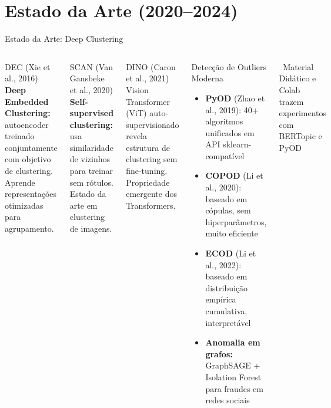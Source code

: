 \documentclass[aspectratio=169]{beamer}
\begin{document}
\section{Estado da Arte (2020--2024)}

\begin{frame}[shrink=5]{Estado da Arte: Deep Clustering}
    \begin{columns}
        \begin{block}{DEC (Xie et al., 2016)}
            \footnotesize
            \textbf{Deep Embedded Clustering:} autoencoder treinado conjuntamente com objetivo de clustering. Aprende representações otimizadas para agrupamento.
        \end{block}
        \begin{block}{SCAN (Van Gansbeke et al., 2020)}
            \footnotesize
            \textbf{Self-supervised clustering:} usa similaridade de vizinhos para treinar sem rótulos. Estado da arte em clustering de imagens.
        \end{block}
        \begin{block}{DINO (Caron et al., 2021)}
            \footnotesize
            Vision Transformer (ViT) auto-supervisionado revela estrutura de clustering sem fine-tuning. Propriedade emergente dos Transformers.
        \end{block}
        \begin{block}{Detecção de Outliers Moderna}
            \begin{itemize}\footnotesize
                \item \textbf{PyOD} (Zhao et al., 2019): 40+ algoritmos unificados em API sklearn-compatível
                \item \textbf{COPOD} (Li et al., 2020): baseado em cópulas, sem hiperparâmetros, muito eficiente
                \item \textbf{ECOD} (Li et al., 2022): baseado em distribuição empírica cumulativa, interpretável
                \item \textbf{Anomalia em grafos:} GraphSAGE + Isolation Forest para fraudes em redes sociais
            \end{itemize}
        \end{block}
        \vspace{0.1cm}
        \centering\tiny \faArrowRight\ Material Didático e Colab trazem experimentos com BERTopic e PyOD
    \end{columns}
\end{frame}
\end{document}
